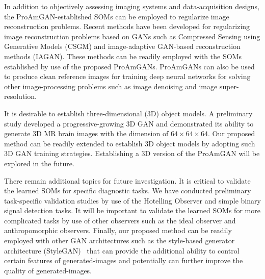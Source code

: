 \documentclass[journal]{IEEEtran}
\begin{document}
 
In addition to objectively assessing imaging systems and data-acquisition designs,
the ProAmGAN-established SOMs can  be employed to regularize image reconstruction problems. 
Recent methods have been developed for regularizing image reconstruction problems based on GANs such as Compressed Sensing using Generative Models (CSGM)\cite{bora2017compressed} and image-adaptive GAN-based reconstruction methods (IAGAN)\cite{hussein2019image, bhadra2020medical}. 
These methods can be readily employed with the SOMs established by use of the proposed ProAmGANs.
ProAmGANs can also be used to produce clean reference images for training deep neural networks for 
solving other image-processing problems such as image denoising\cite{zhang2017beyond} and image super-resolution\cite{dong2014learning}.

It is desirable to establish three-dimensional (3D) object models.
A preliminary study developed a progressive-growing 3D GAN\cite{eklund2019feeding} and demonstrated its ability to generate 3D MR brain images with the dimension of $64\times 64\times 64$.
Our proposed method
can be readily extended to establish 3D object models
 by adopting such 3D GAN training strategies.
 Establishing a 3D version of the ProAmGAN will be explored in the future.
 
There remain additional topics for future investigation. 
It is critical to validate the learned SOMs for specific diagnostic tasks.
We have conducted preliminary 
task-specific validation studies by use of the Hotelling Observer \cite{barrett2013foundations, zhou2019learning_HO} and simple binary signal detection tasks.
It will be important to validate the learned SOMs for more complicated tasks by use of other observers such as the ideal observer\cite{zhou2018learning, zhou2019approximating, zhou2019learningIO, zhou2020markov} and anthropomorphic observers\cite{massanes2017evaluation}.
Finally, our proposed method can be readily employed with other GAN architectures such as 
the style-based generator architecture (StyleGAN)~\cite{karras2019style, karras2019analyzing} that can provide the additional ability to control certain features of generated-images and potentially can further improve the quality of generated-images. 

{}

\end{document}
